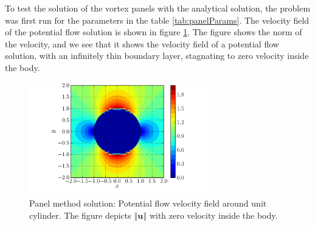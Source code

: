 %	    
%	
	
	

To test the solution of the vortex panels with the analytical solution, the problem was first run for the parameters in the table \ref{tab:panelParams}. The velocity field of the potential flow solution is shown in figure \ref{fig:panelCylinder_velocityField}. The figure shows the norm of the velocity, and we see that it shows the velocity field of a potential flow solution, with an infinitely thin boundary layer, stagnating to zero velocity inside the body.

	\begin{figure}[t]
	\centering
	\includegraphics[width=0.7\textwidth]{figures/lagrangian/panelCylinder_velocityField.pdf}
	\caption{Panel method solution: Potential flow velocity field around unit cylinder. The figure depicts $\left\Vert\mathbf{u}\right\Vert$ with zero velocity inside the body.}
	\label{fig:panelCylinder_velocityField}
	\end{figure}

